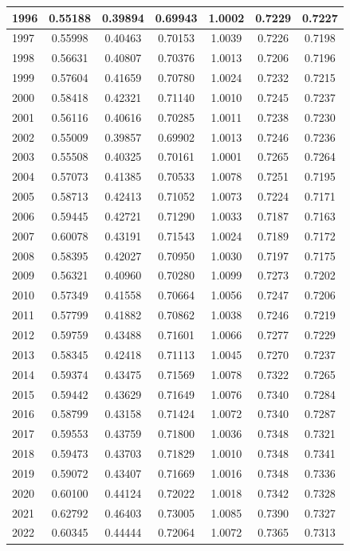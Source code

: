 \documentclass[11pt]{article}
\begin{document}
\begin{table}[htbp]
{\begin{tabular}{|l|c|c|c|c|c|c|}
1996 & 0.55188 & 0.39894 & 0.69943 & 1.0002 & 0.7229 & 0.7227\\ \hline 
1997 & 0.55998 & 0.40463 & 0.70153 & 1.0039 & 0.7226 & 0.7198\\ \hline 
1998 & 0.56631 & 0.40807 & 0.70376 & 1.0013 & 0.7206 & 0.7196\\ \hline 
1999 & 0.57604 & 0.41659 & 0.70780 & 1.0024 & 0.7232 & 0.7215\\ \hline 
2000 & 0.58418 & 0.42321 & 0.71140 & 1.0010 & 0.7245 & 0.7237\\ \hline 
2001 & 0.56116 & 0.40616 & 0.70285 & 1.0011 & 0.7238 & 0.7230\\ \hline 
2002 & 0.55009 & 0.39857 & 0.69902 & 1.0013 & 0.7246 & 0.7236\\ \hline 
2003 & 0.55508 & 0.40325 & 0.70161 & 1.0001 & 0.7265 & 0.7264\\ \hline 
2004 & 0.57073 & 0.41385 & 0.70533 & 1.0078 & 0.7251 & 0.7195\\ \hline 
2005 & 0.58713 & 0.42413 & 0.71052 & 1.0073 & 0.7224 & 0.7171\\ \hline 
2006 & 0.59445 & 0.42721 & 0.71290 & 1.0033 & 0.7187 & 0.7163\\ \hline 
2007 & 0.60078 & 0.43191 & 0.71543 & 1.0024 & 0.7189 & 0.7172\\ \hline 
2008 & 0.58395 & 0.42027 & 0.70950 & 1.0030 & 0.7197 & 0.7175\\ \hline 
2009 & 0.56321 & 0.40960 & 0.70280 & 1.0099 & 0.7273 & 0.7202\\ \hline 
2010 & 0.57349 & 0.41558 & 0.70664 & 1.0056 & 0.7247 & 0.7206\\ \hline 
2011 & 0.57799 & 0.41882 & 0.70862 & 1.0038 & 0.7246 & 0.7219\\ \hline 
2012 & 0.59759 & 0.43488 & 0.71601 & 1.0066 & 0.7277 & 0.7229\\ \hline 
2013 & 0.58345 & 0.42418 & 0.71113 & 1.0045 & 0.7270 & 0.7237\\ \hline 
2014 & 0.59374 & 0.43475 & 0.71569 & 1.0078 & 0.7322 & 0.7265\\ \hline 
2015 & 0.59442 & 0.43629 & 0.71649 & 1.0076 & 0.7340 & 0.7284\\ \hline 
2016 & 0.58799 & 0.43158 & 0.71424 & 1.0072 & 0.7340 & 0.7287\\ \hline 
2017 & 0.59553 & 0.43759 & 0.71800 & 1.0036 & 0.7348 & 0.7321\\ \hline 
2018 & 0.59473 & 0.43703 & 0.71829 & 1.0010 & 0.7348 & 0.7341\\ \hline 
2019 & 0.59072 & 0.43407 & 0.71669 & 1.0016 & 0.7348 & 0.7336\\ \hline 
2020 & 0.60100 & 0.44124 & 0.72022 & 1.0018 & 0.7342 & 0.7328\\ \hline 
2021 & 0.62792 & 0.46403 & 0.73005 & 1.0085 & 0.7390 & 0.7327\\ \hline 
2022 & 0.60345 & 0.44444 & 0.72064 & 1.0072 & 0.7365 & 0.7313\\ \hline 
\end{tabular}
}
\end{table}
\end{document}
